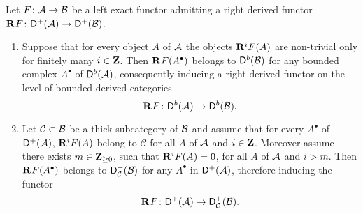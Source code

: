 \begin{proposition}
    \label{Spectral sequences for derived cats}
    \emph{\cite[\S 2, Corollary 2.68]{huybrechts2006fouriermukai}}
    Let $F \colon \mathcal A \to \mathcal B$ be a left exact functor admitting a right derived functor $\mathbf{R}^{}F\colon \mathsf{D}^+(\mathcal A) \to \mathsf{D}^+(\mathcal B)$. 
    \begin{enumerate}[label = (\roman*)]
        \item{Suppose that for every object $A$ of $\mathcal A$ the objects $\mathbf{R}^{i}F(A)$ are non-trivial only for finitely many $i \in \mathbf Z$. Then $\mathbf{R}^{}F(A^\bullet)$ belongs to $\mathsf{D}^b(\mathcal B)$ for any bounded complex $A^\bullet$ of $\mathsf{D}^b(\mathcal A)$, consequently inducing a right derived functor on the level of bounded derived categories
        \[
            \mathbf{R}^{}F \colon \mathsf{D}^b(\mathcal A) \to \mathsf{D}^b(\mathcal B).
        \]} \label{Bounded on objects implies bounded on complexes}
        \item{Let $\mathcal C \subset \mathcal B$ be a thick subcategory of $\mathcal B$ and assume that for every $A^\bullet$ of $\mathsf{D}^+(\mathcal A)$, $\mathbf{R}^{i}F(A)$ belong to $\mathcal C$ for all $A$ of $\mathcal A$ and $i \in \mathbf Z$. Moreover assume there exists $m \in \mathbf Z_{\geq 0}$, such that $\mathbf{R}^{i}F(A) = 0$, for all $A$ of $\mathcal A$ and $i > m$. Then $\mathbf{R}^{}F(A^\bullet)$ belongs to $\mathsf{D}^+_\mathcal{C}(\mathcal B)$ for any $A^\bullet$ in $\mathsf{D}^+(\mathcal A)$, therefore inducing the functor
        \[
            \mathbf{R}^{}F\colon \mathsf{D}^+(\mathcal A) \to \mathsf{D}^+_\mathcal{C}(\mathcal B).
        \]
        } \label{Cohomology in a thick subcategory}
    \end{enumerate}
\end{proposition}

